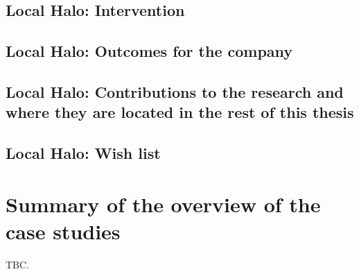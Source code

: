 \subsection{Local Halo: Intervention}

\subsection{Local Halo: Outcomes for the company}

\subsection{Local Halo: Contributions to the research and where they are located in the rest of this thesis}

\subsection*{Local Halo: Wish list}

\clearpage


\section{Summary of the overview of the case studies}
TBC.


